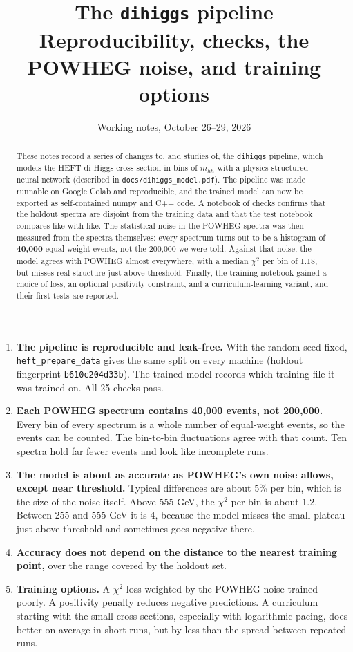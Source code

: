 \documentclass[11pt]{article}
\title{\textbf{The \texttt{dihiggs} pipeline}\\[4pt]
\large Reproducibility, checks, the POWHEG noise, and training options}
\date{Working notes, October 26--29, 2026}
\newcommand{\file}[1]{\nolinkurl{#1}}
\newcommand{\code}[1]{\texttt{#1}}
\newcommand{\mhh}{m_{hh}}
\begin{document}
\maketitle

\begin{abstract}
\noindent
These notes record a series of changes to, and studies of, the \code{dihiggs}
pipeline, which models the HEFT di-Higgs cross section in bins of $\mhh$ with a
physics-structured neural network (described in \file{docs/dihiggs_model.pdf}).
The pipeline was made runnable on Google Colab and reproducible, and the trained
model can now be exported as self-contained numpy and C++ code. A notebook of
checks confirms that the holdout spectra are disjoint from the training data and
that the test notebook compares like with like. The statistical noise in the POWHEG
spectra was then measured from the spectra themselves: every spectrum turns out to
be a histogram of \textbf{40,000} equal-weight events, not the 200,000 we were told.
Against that noise, the model agrees with POWHEG almost everywhere, with a median
$\chi^2$ per bin of 1.18, but misses real structure just above threshold. Finally,
the training notebook gained a choice of loss, an optional positivity constraint,
and a curriculum-learning variant, and their first tests are reported.
\end{abstract}

\begin{keyidea}
\begin{enumerate}
  \item \textbf{The pipeline is reproducible and leak-free.} With the random seed
  fixed, \code{heft\_prepare\_data} gives the same split on every machine (holdout
  fingerprint \code{b610c204d33b}). The trained model records which training file it
  was trained on. All 25 checks pass.
  \item \textbf{Each POWHEG spectrum contains 40,000 events, not 200,000.} Every
  bin of every spectrum is a whole number of equal-weight events, so the events can
  be counted. The bin-to-bin fluctuations agree with that count. Ten spectra hold
  far fewer events and look like incomplete runs.
  \item \textbf{The model is about as accurate as POWHEG's own noise allows, except
  near threshold.} Typical differences are about 5\% per bin, which is the size of
  the noise itself. Above 555 GeV, the $\chi^2$ per bin is about 1.2. Between 255 and
  555 GeV it is 4, because the model misses the small plateau just above threshold
  and sometimes goes negative there.
  \item \textbf{Accuracy does not depend on the distance to the nearest training
  point,} over the range covered by the holdout set.
  \item \textbf{Training options.} A $\chi^2$ loss weighted by the POWHEG noise
  trained poorly. A positivity penalty reduces negative predictions. A curriculum
  starting with the small cross sections, especially with logarithmic pacing, does
  better on average in short runs, but by less than the spread between repeated runs.
\end{enumerate}
\end{keyidea}
\end{document}
